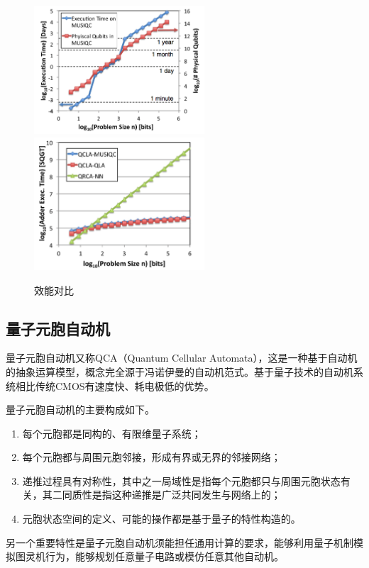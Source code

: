 \documentclass[UTF8, 11pt, a4paper]{ctexart}
\begin{document}
\begin{figure}
\begin{center}
\includegraphics[width=2.5in]{musiqc_performance}
\includegraphics[width=2.5in]{musiqc_time}
\caption{效能对比}
\label{gf:musiqc}
\end{center}
\end{figure}

\subsection{量子元胞自动机}

量子元胞自动机又称QCA（Quantum Cellular Automata），这是一种基于自动机的抽象运算模型，概念完全源于冯诺伊曼的自动机范式。基于量子技术的自动机系统相比传统CMOS有速度快、耗电极低的优势\cite{qca}。

量子元胞自动机的主要构成如下。

\begin{enumerate}
  \item 每个元胞都是同构的、有限维量子系统；
  \item 每个元胞都与周围元胞邻接，形成有界或无界的邻接网络；
  \item 递推过程具有对称性，其中之一局域性是指每个元胞都只与周围元胞状态有关，其二同质性是指这种递推是广泛共同发生与网络上的；
  \item 元胞状态空间的定义、可能的操作都是基于量子的特性构造的。
\end{enumerate}

另一个重要特性是量子元胞自动机须能担任通用计算的要求，能够利用量子机制模拟图灵机行为，能够规划任意量子电路或模仿任意其他自动机。
\end{document}
